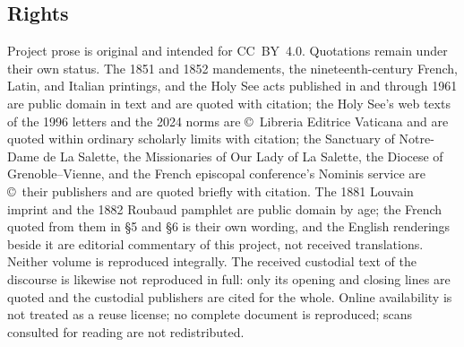 \subsection*{Rights}

Project prose is original and intended for CC~BY~4.0. Quotations
remain under their own status. The 1851 and 1852 mandements, the
nineteenth-century French, Latin, and Italian printings, and the
Holy See acts published in  and
 through 1961 are public domain in
text and are quoted with citation; the Holy See's web texts of the
1996 letters and the 2024 norms are \copyright\ Libreria Editrice
Vaticana and are quoted within ordinary scholarly limits with
citation; the Sanctuary of Notre-Dame de La Salette, the
Missionaries of Our Lady of La Salette, the Diocese of
Grenoble--Vienne, and the French episcopal conference's Nominis
service are \copyright\ their publishers and are quoted briefly with
citation. The 1881 Louvain imprint and the 1882 Roubaud pamphlet are
public domain by age; the French quoted from them in \S5 and \S6 is
their own wording, and the English renderings beside it are
editorial commentary of this project, not received translations.
Neither volume is reproduced integrally. The received custodial text
of the discourse is likewise not reproduced in full: only its opening
and closing lines are quoted and the custodial publishers are cited
for the whole. Online
availability is not treated as a reuse license; no complete document
is reproduced; scans consulted for reading are not redistributed.
